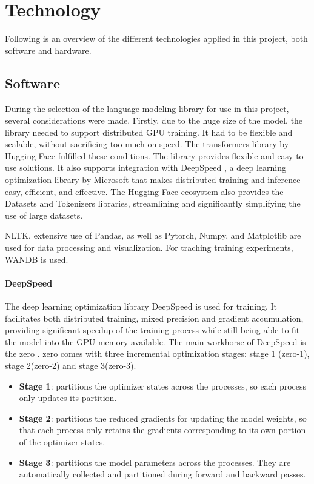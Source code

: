 
\section{Technology}
\label{sec:technology}
Following is an overview of the different technologies applied in this project, both software and hardware.

\subsection{Software}
\label{sec:software}
During the selection of the language modeling library for use in this project, several considerations were made. Firstly, due to the huge size of the model, the library needed to support distributed GPU training. It had to be flexible and scalable, without sacrificing too much on speed. The transformers \cite{transformers} library by Hugging Face \cite{huggingface} fulfilled these conditions. The library provides flexible and easy-to-use solutions. It also supports integration with DeepSpeed \cite{deepspeed}, a deep learning optimization library by Microsoft \cite{microsoft} that makes distributed training and inference easy, efficient, and effective. The Hugging Face ecosystem also provides the Datasets and Tokenizers libraries, streamlining and significantly simplifying the use of large datasets.

NLTK, extensive use of Pandas, as well as Pytorch, Numpy, and Matplotlib are used for data processing and visualization. For traching training experiments, WANDB is used.

\paragraph{DeepSpeed}
\label{par:deepspeed}
The deep learning optimization library DeepSpeed \cite{deepspeed} is used for training. It facilitates both distributed training, mixed precision and gradient accumulation, providing significant speedup of the training process while still being able to fit the model into the GPU memory available. The main workhorse of DeepSpeed is the \acrfull{zero} \cite{zero}. \acrshort{zero} comes with three incremental optimization stages: stage 1 (\acrshort{zero}-1), stage 2(\acrshort{zero}-2) and stage 3(\acrshort{zero}-3).

\begin{itemize}
    \item \textbf{Stage 1}: partitions the optimizer states across the processes, so each process only updates its partition.
    \item \textbf{Stage 2}: partitions the reduced gradients for updating the model weights, so that each process only retains the gradients corresponding to its own portion of the optimizer states.
    \item \textbf{Stage 3}: partitions the model parameters across the processes. They are automatically collected and partitioned during forward and backward passes.
\end{itemize}

